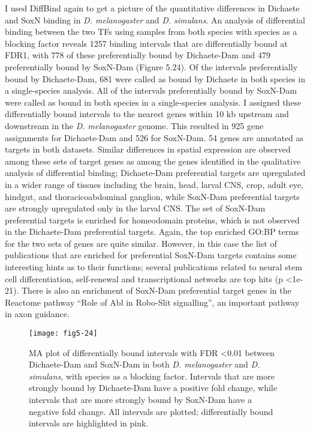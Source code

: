 I used DiffBind again to get a picture of the quantitative differences in Dichaete and SoxN binding in \emph{D. melanogaster} and \emph{D. simulans}. An analysis of differential binding between the two TFs using samples from both species with species as a blocking factor reveals 1257 binding intervals that are differentially bound at FDR1, with 778 of these preferentially bound by Dichaete-Dam and 479 preferentially bound by SoxN-Dam (Figure 5.24). Of the intervals preferentially bound by Dichaete-Dam, 681 were called as bound by Dichaete in both species in a single-species analysis. All of the intervals preferentially bound by SoxN-Dam were called as bound in both species in a single-species analysis. I assigned these differentially bound intervals to the nearest genes within 10 kb upstream and downstream in the \emph{D. melanogaster} genome. This resulted in 925 gene assignments for Dichaete-Dam and 526 for SoxN-Dam. 54 genes are annotated as targets in both datasets. Similar differences in spatial expression are observed among these sets of target genes as among the genes identified in the qualitative analysis of differential binding; Dichaete-Dam preferential targets are upregulated in a wider range of tissues including the brain, head, larval CNS, crop, adult eye, hindgut, and thoracicoabdominal ganglion, while SoxN-Dam preferential targets are strongly upregulated only in the larval CNS. The set of SoxN-Dam preferential targets is enriched for homeodomain proteins, which is not observed in the Dichaete-Dam preferential targets. Again, the top enriched GO:BP terms for the two sets of genes are quite similar. However, in this case the list of publications that are enriched for preferential SoxN-Dam targets contains some interesting hints as to their functions; several publications related to neural stem cell differentiation, self-renewal and transcriptional networks are top hits (p \textless 1e-21). There is also an enrichment of SoxN-Dam preferential target genes in the Reactome pathway “Role of Abl in Robo-Slit signalling”, an important pathway in axon guidance.\\

\begin{figure}
\centering
\texttt{[image: fig5-24]}
\caption{MA plot of differentially bound intervals with FDR \textless 0.01 between Dichaete-Dam and SoxN-Dam in both \emph{D. melanogaster} and \emph{D. simulans}, with species as a blocking factor. Intervals that are more strongly bound by Dichaete-Dam have a positive fold change, while intervals that are more strongly bound by SoxN-Dam have a negative fold change. All intervals are plotted; differentially bound intervals are highlighted in pink.}
\label{Figure 5.24}
\end{figure}

